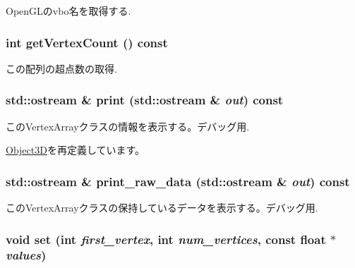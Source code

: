 OpenGLのvbo名を取得する. \hypertarget{classm3g_1_1VertexArray_c1c9b7f5b0dcd9c0310d7e77e10081ba}{
\subsubsection[{getVertexCount}]{\setlength{\rightskip}{0pt plus 5cm}int getVertexCount () const}}
\label{classm3g_1_1VertexArray_c1c9b7f5b0dcd9c0310d7e77e10081ba}


この配列の超点数の取得. \hypertarget{classm3g_1_1VertexArray_6fea17fa1532df3794f8cb39cb4f911f}{
\subsubsection[{print}]{\setlength{\rightskip}{0pt plus 5cm}std::ostream \& print (std::ostream \& {\em out}) const}}
\label{classm3g_1_1VertexArray_6fea17fa1532df3794f8cb39cb4f911f}


このVertexArrayクラスの情報を表示する。デバッグ用. 

\hyperlink{classm3g_1_1Object3D_6fea17fa1532df3794f8cb39cb4f911f}{Object3D}を再定義しています。\hypertarget{classm3g_1_1VertexArray_85d61f1cdd10b3b5126cdb20291ae276}{
\subsubsection[{print\_\-raw\_\-data}]{\setlength{\rightskip}{0pt plus 5cm}std::ostream \& print\_\-raw\_\-data (std::ostream \& {\em out}) const}}
\label{classm3g_1_1VertexArray_85d61f1cdd10b3b5126cdb20291ae276}


このVertexArrayクラスの保持しているデータを表示する。デバッグ用. \hypertarget{classm3g_1_1VertexArray_24b9d666468f856b2bf09e450b20fdfb}{
\subsubsection[{set}]{\setlength{\rightskip}{0pt plus 5cm}void set (int {\em first\_\-vertex}, \/  int {\em num\_\-vertices}, \/  const float $\ast$ {\em values})}}
\label{classm3g_1_1VertexArray_24b9d666468f856b2bf09e450b20fdfb}


